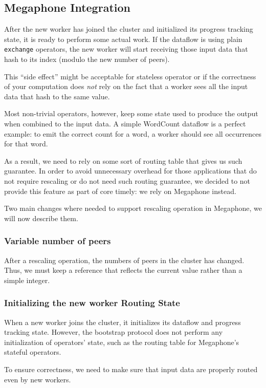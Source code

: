 \documentclass[12pt]{extarticle}
\begin{document}
\subsection{Megaphone Integration}

After the new worker has joined the cluster and initialized its progress tracking state, it is ready to perform some actual
work. If the dataflow is using plain \verb|exchange| operators, the new worker will start receiving those input data
that hash to its index (modulo the new number of peers).

This ``side effect'' might be acceptable for stateless operator or if the correctness of your computation does \textit{not}
rely on the fact that a worker sees all the input data that hash to the same value.

Most non-trivial operators, however, keep some state used to produce the output when combined to the input data.
A simple WordCount dataflow is a perfect example: to emit the correct count for a word,
a worker should see all occurrences for that word.

As a result, we need to rely on some sort of routing table that gives us such guarantee.
In order to avoid unnecessary overhead for those applications that do not require rescaling or do not need such routing
guarantee, we decided to not provide this feature as part of core timely: we rely on Megaphone instead.

Two main changes where needed to support rescaling operation in Megaphone, we will now describe them.

\subsubsection{Variable number of peers}
After a rescaling operation, the numbers of peers in the cluster has changed. Thus, we must keep a reference
that reflects the current value rather than a simple integer.

\subsubsection{Initializing the new worker Routing State}
When a new worker joins the cluster, it initializes its dataflow and progress tracking state.
However, the bootstrap protocol does not perform any initialization of operators' state, such as the
routing table for Megaphone's stateful operators.

To ensure correctness, we need to make sure that input data are properly routed even by new workers.
\end{document}
